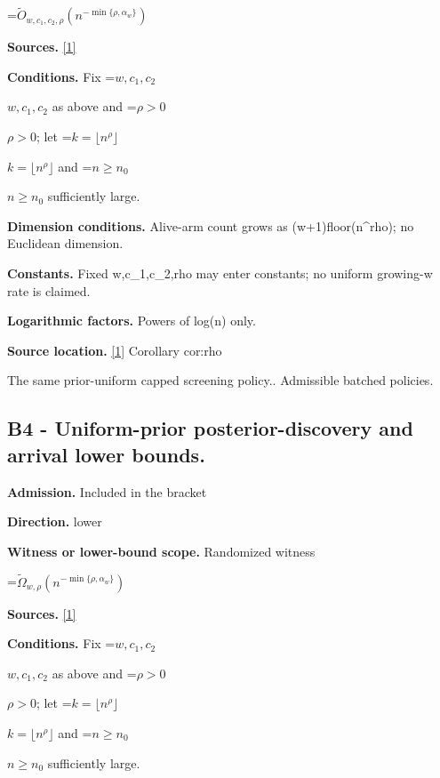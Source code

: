 \documentclass[10pt,a4paper]{article}
\newcommand{\AtlasMath}[1]{\par\begingroup\centering\setbox0=\hbox{$\displaystyle #1$}\ifdim\wd0>1.4\linewidth\typeout{ATLAS WIDE FORMULA: \the\wd0}\fi\ifdim\wd0>\linewidth\resizebox{\linewidth}{!}{\box0}\else\box0\fi\par\endgroup}
\newcommand{\AtlasInlineMath}[1]{\begingroup\setbox0=\hbox{$#1$}\ifdim\wd0>.4\linewidth\endgroup\AtlasMath{#1}\else\endgroup$#1$\fi}
\begin{document}
\AtlasMath{\widetilde O_{w,c_1,c_2,\rho}(n^{-\min\{\rho,\alpha_w\}})}


\textbf{Sources.} \href{https://github.com/WU-Wendao/Colombo/blob/main/colombo_sensorium/Complexity_altas/data/sources/colombo/U09/manuscript.pdf}{[1]}



\textbf{Conditions.} Fix \AtlasInlineMath{w,c_1,c_2} as above and \AtlasInlineMath{\rho>0}; let \AtlasInlineMath{k=\lfloor n^\rho\rfloor} and \AtlasInlineMath{n\ge n_0} sufficiently large.



\textbf{Dimension conditions.} Alive-arm count grows as (w+1)floor(n\textasciicircum{}rho); no Euclidean dimension.



\textbf{Constants.} Fixed w,c\_1,c\_2,rho may enter constants; no uniform growing-w rate is claimed.



\textbf{Logarithmic factors.} Powers of log(n) only.



\textbf{Source location.} \href{https://github.com/WU-Wendao/Colombo/blob/main/colombo_sensorium/Complexity_altas/data/sources/colombo/U09/manuscript.pdf}{[1]} Corollary cor:rho



The same prior-uniform capped screening policy.. Admissible batched policies.



\subsection{B4 - Uniform-prior posterior-discovery and arrival lower bounds.}


\textbf{Admission.} Included in the bracket



\textbf{Direction.} lower



\textbf{Witness or lower-bound scope.} Randomized witness



\AtlasMath{\widetilde\Omega_{w,\rho}(n^{-\min\{\rho,\alpha_w\}})}


\textbf{Sources.} \href{https://github.com/WU-Wendao/Colombo/blob/main/colombo_sensorium/Complexity_altas/data/sources/colombo/U09/manuscript.pdf}{[1]}



\textbf{Conditions.} Fix \AtlasInlineMath{w,c_1,c_2} as above and \AtlasInlineMath{\rho>0}; let \AtlasInlineMath{k=\lfloor n^\rho\rfloor} and \AtlasInlineMath{n\ge n_0} sufficiently large.
\end{document}
